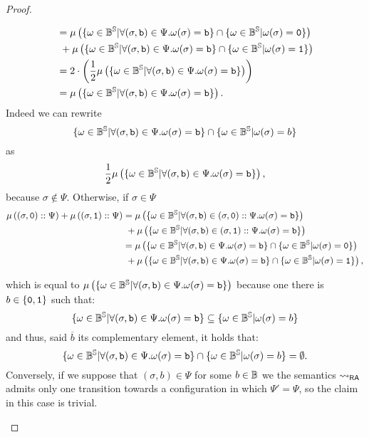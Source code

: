 \begin{proof}
\begin{itemize}
\begin{align*}
                                                           &= \mu\left(\{\omega \in \Bool^\Ss | \forall (\sigma, \bool) \in \Psi. \omega(\sigma)=\bool\}\cap \{\omega \in \Bool^\Ss| \omega(\sigma)= \zero\}\right)\\
                                                           &\ +\mu\left(\{\omega \in \Bool^\Ss | \forall (\sigma, \bool) \in \Psi. \omega(\sigma)=\bool\}\cap \{\omega \in \Bool^\Ss| \omega(\sigma)= \one\}\right)\\
                                   &=2 \cdot\left(\frac 1 2 \mu\left(\{\omega \in \Bool^\Ss | \forall (\sigma, \bool) \in \Psi. \omega(\sigma)=\bool\}\right)\right)\\
                                   &=\mu\left(\{\omega \in \Bool^\Ss | \forall (\sigma, \bool) \in \Psi. \omega(\sigma)=\bool\}\right).
   \end{align*}
   Indeed we can rewrite
   $$
   \{\omega \in \mathbb{B}^{\mathbb{S}} | \forall (\sigma, \mathtt{b}) \in \Psi. \omega(\sigma)=\mathtt{b}\}\cap \{\omega \in \mathbb{B}^{\mathbb{S}}| \omega(\sigma)= b\}
   $$
   as
   $$
   \frac 1 2 \mu\left(\{\omega \in \mathbb{B}^{\mathbb{S}} | \forall (\sigma, \mathtt{b}) \in \Psi. \omega(\sigma)=\mathtt{b}\}\right),
   $$
   because $\sigma \not \in \Psi$.
   Otherwise, if $\sigma \in \Psi$
   \begin{align*}
     \mu\left((\sigma, \zero)::\Psi\right)+\mu \left((\sigma, \one)::\Psi\right) &= \mu\left(\{\omega \in \Bool^\Ss | \forall (\sigma, \bool) \in (\sigma, \zero)::\Psi. \omega(\sigma)=\bool\}\right)\\
                                                           &\ +\mu\left(\{\omega \in \Bool^\Ss | \forall (\sigma, \bool) \in (\sigma, \one)::\Psi. \omega(\sigma)=\bool\}\right)\\
                                                           &= \mu\left(\{\omega \in \Bool^\Ss | \forall (\sigma, \bool) \in \Psi. \omega(\sigma)=\bool\}\cap \{\omega \in \Bool^\Ss| \omega(\sigma)= \zero\}\right)\\
                                                           &\ +\mu\left(\{\omega \in \Bool^\Ss | \forall (\sigma, \bool) \in \Psi. \omega(\sigma)=\bool\}\cap \{\omega \in \Bool^\Ss| \omega(\sigma)= \one\}\right),
   \end{align*}

   which is equal to $\mu\left(\{\omega \in \mathbb{B}^{\mathbb{S}} | \forall (\sigma, \mathtt{b}) \in \Psi. \omega(\sigma)=\mathtt{b}\}\right)$
   because one there is $b \in \{\mathtt{0}, \mathtt{1}\}$ such that:
   $$
   \{\omega \in \mathbb{B}^{\mathbb{S}} | \forall (\sigma, \mathtt{b}) \in \Psi. \omega(\sigma)=\mathtt{b}\} \subseteq \{\omega \in \mathbb{B}^{\mathbb{S}}| \omega(\sigma)= b\}
   $$
   and thus, said $\overline b$ its complementary element, it holds that:
   $$
   \{\omega \in \mathbb{B}^{\mathbb{S}} | \forall (\sigma, \mathtt{b}) \in \Psi. \omega(\sigma)=\mathtt{b}\} \cap \{\omega \in \mathbb{B}^{\mathbb{S}}| \omega(\sigma)= b\}= \emptyset.
   $$
   Conversely, if we suppose that $(\sigma, b) \in \Psi$ for some $b \in \mathbb{B}$
   we the semantics ${\leadsto_{\mathsf{RA}}}$ admits only one transition towards a configuration
   in which $\Psi'=\Psi$, so the claim in this case is trivial.
  \end{itemize}
\end{proof}


